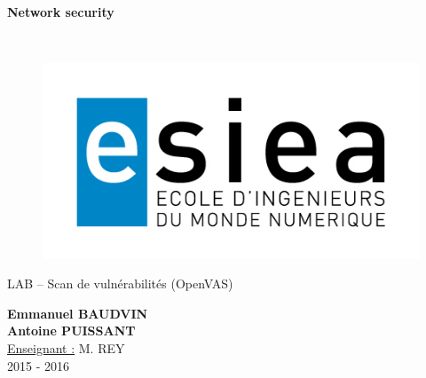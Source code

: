 \begin{titlepage}
      \begin{center}   
        \Huge
        \textbf{Network security}
        
        \LARGE
        ~
        
        
        \vfill
        \begin{figure}[H]
	    \centering
	    \begin{minipage}{0.89\textwidth}
		\centering
		\includegraphics[width=\textwidth]{./img/esiea.jpeg}
	    \end{minipage}
	\end{figure}
        \vfill
        
        \vspace{0.5cm}
        
        LAB -- Scan de vulnérabilités (OpenVAS)
        
        \vspace{2cm}
        \textbf{Emmanuel BAUDVIN\\Antoine PUISSANT}\\
        \vspace{0.8cm}
        \Large
        \underline{Enseignant :} M. REY\\
        \vspace{0.5cm}
        2015 - 2016%
        
    \end{center}
\end{titlepage}